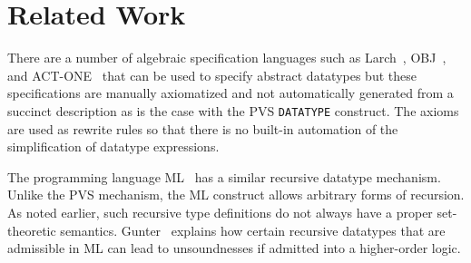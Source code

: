 \documentclass[11pt,twoside]{book}
\begin{document}

  

\chapter{Related Work}\label{related}

There are a number of algebraic specification languages such as
Larch~\cite{Larch93}, OBJ~\cite{popl85}, and ACT-ONE~\cite{Ehrig-Mahr}
that can be used to specify 
abstract datatypes but these specifications are manually axiomatized
and  not automatically generated from a succinct description as is the
case with the PVS \texttt{DATATYPE} construct.  The axioms are used as
rewrite rules so that there is no built-in automation of the simplification
of datatype expressions.   


The 
programming language ML~\cite{ML-report} has a similar recursive datatype
mechanism. 
Unlike the PVS mechanism, the ML construct allows arbitrary forms of
recursion.  As noted earlier, such recursive type definitions do not
always have a proper set-theoretic semantics.  Gunter~\cite{Gunter93}
explains how certain recursive datatypes that are admissible in ML
can lead to unsoundnesses if admitted into a higher-order logic.  
\end{document}
